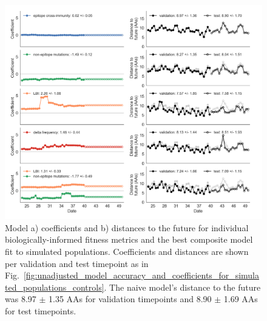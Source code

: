 \begin{figure}[ht!]
  \begin{center}
  \includegraphics[width=\textwidth]{figures/unadjusted-model-accuracy-and-coefficients-for-simulated-populations.png}
  \caption{
    Model a) coefficients and b) distances to the future for individual biologically-informed fitness metrics and the best composite model fit to simulated populations.
    Coefficients and distances are shown per validation and test timepoint as in Fig.~\ref{fig:unadjusted_model_accuracy_and_coefficients_for_simulated_populations_controls}.
    The naive model's distance to the future was 8.97 $\pm$ 1.35 AAs for validation timepoints and 8.90 $\pm$ 1.69 AAs for test timepoints.
  }
  \label{fig:unadjusted_model_accuracy_and_coefficients_for_simulated_populations}
  \end{center}
\end{figure}

